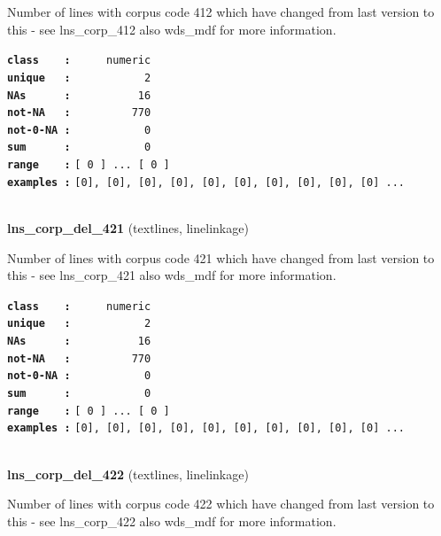 \documentclass[]{article}
\begin{document}
Number of lines with corpus code 412 which have changed from last
version to this - see lns\_corp\_412 also wds\_mdf for more information.

\textbf{\texttt{class\ \ \ \ :}} \texttt{~~~~~numeric}\\
\textbf{\texttt{unique\ \ \ :}} \texttt{~~~~~~~~~~~2}\\
\textbf{\texttt{NAs\ \ \ \ \ \ :}} \texttt{~~~~~~~~~~16}\\
\textbf{\texttt{not-NA\ \ \ :}} \texttt{~~~~~~~~~770}\\
\textbf{\texttt{not-0-NA\ :}} \texttt{~~~~~~~~~~~0}\\
\textbf{\texttt{sum\ \ \ \ \ \ :}} \texttt{~~~~~~~~~~~0}\\
\textbf{\texttt{range\ \ \ \ :}}
\texttt{{[}\ 0\ {]}\ ...\ {[}\ 0\ {]}}\\
\textbf{\texttt{examples\ :}}
\texttt{{[}0{]},\ {[}0{]},\ {[}0{]},\ {[}0{]},\ {[}0{]},\ {[}0{]},\ {[}0{]},\ {[}0{]},\ {[}0{]},\ {[}0{]}\ ...}\\

~

\textbf{lns\_corp\_del\_421} (textlines, linelinkage)

Number of lines with corpus code 421 which have changed from last
version to this - see lns\_corp\_421 also wds\_mdf for more information.

\textbf{\texttt{class\ \ \ \ :}} \texttt{~~~~~numeric}\\
\textbf{\texttt{unique\ \ \ :}} \texttt{~~~~~~~~~~~2}\\
\textbf{\texttt{NAs\ \ \ \ \ \ :}} \texttt{~~~~~~~~~~16}\\
\textbf{\texttt{not-NA\ \ \ :}} \texttt{~~~~~~~~~770}\\
\textbf{\texttt{not-0-NA\ :}} \texttt{~~~~~~~~~~~0}\\
\textbf{\texttt{sum\ \ \ \ \ \ :}} \texttt{~~~~~~~~~~~0}\\
\textbf{\texttt{range\ \ \ \ :}}
\texttt{{[}\ 0\ {]}\ ...\ {[}\ 0\ {]}}\\
\textbf{\texttt{examples\ :}}
\texttt{{[}0{]},\ {[}0{]},\ {[}0{]},\ {[}0{]},\ {[}0{]},\ {[}0{]},\ {[}0{]},\ {[}0{]},\ {[}0{]},\ {[}0{]}\ ...}\\

~

\textbf{lns\_corp\_del\_422} (textlines, linelinkage)

Number of lines with corpus code 422 which have changed from last
version to this - see lns\_corp\_422 also wds\_mdf for more information.
\end{document}
